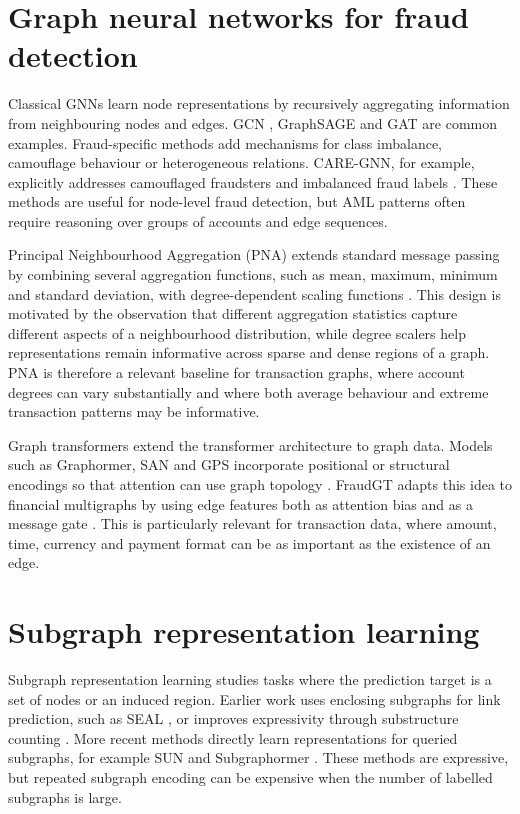 \documentclass[12pt, twocolumn]{report}
\begin{document}
\section{Graph neural networks for fraud detection}

Classical GNNs learn node representations by recursively aggregating information from neighbouring nodes and edges. GCN \cite{kipf2017semi}, GraphSAGE \cite{hamilton2017inductive} and GAT \cite{velivckovic2018gat} are common examples. Fraud-specific methods add mechanisms for class imbalance, camouflage behaviour or heterogeneous relations. CARE-GNN, for example, explicitly addresses camouflaged fraudsters and imbalanced fraud labels \cite{dou2020enhancing}. These methods are useful for node-level fraud detection, but AML patterns often require reasoning over groups of accounts and edge sequences.

Principal Neighbourhood Aggregation (PNA) extends standard message passing by combining several aggregation functions, such as mean, maximum, minimum and standard deviation, with degree-dependent scaling functions \cite{corso2020pna}. This design is motivated by the observation that different aggregation statistics capture different aspects of a neighbourhood distribution, while degree scalers help representations remain informative across sparse and dense regions of a graph. PNA is therefore a relevant baseline for transaction graphs, where account degrees can vary substantially and where both average behaviour and extreme transaction patterns may be informative.

Graph transformers extend the transformer architecture \cite{vaswani2017attention} to graph data. Models such as Graphormer, SAN and GPS incorporate positional or structural encodings so that attention can use graph topology \cite{ying2021graphormer,kreuzer2021rethinking,rampasek2022recipe}. FraudGT adapts this idea to financial multigraphs by using edge features both as attention bias and as a message gate \cite{fraudgt2024}. This is particularly relevant for transaction data, where amount, time, currency and payment format can be as important as the existence of an edge.

\section{Subgraph representation learning}

Subgraph representation learning studies tasks where the prediction target is a set of nodes or an induced region. Earlier work uses enclosing subgraphs for link prediction, such as SEAL \cite{zhang2018link}, or improves expressivity through substructure counting \cite{bouritsas2022improving}. More recent methods directly learn representations for queried subgraphs, for example SUN \cite{franca2022subgraph} and Subgraphormer \cite{subgraphormer2024}. These methods are expressive, but repeated subgraph encoding can be expensive when the number of labelled subgraphs is large.
\end{document}
